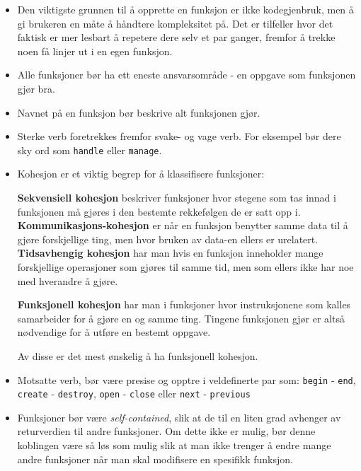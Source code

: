 \begin{itemize}
    \item Den viktigste grunnen til å opprette en funksjon er ikke kodegjenbruk, men å gi brukeren en måte å håndtere kompleksitet på. Det er tilfeller hvor det faktisk er mer lesbart å repetere dere selv et par ganger, fremfor å trekke noen få linjer ut i en egen funksjon.
    
    \item Alle funksjoner bør ha ett eneste ansvarsområde - en oppgave som funksjonen gjør bra.
    
    \item Navnet på en funksjon bør beskrive alt funksjonen gjør.
    
    \item Sterke verb foretrekkes fremfor svake- og vage verb. For eksempel bør dere sky ord som \verb|handle| eller \verb|manage|.
    
    \item Kohesjon er et viktig begrep for å klassifisere funksjoner:
    \begin{outline}
    \1 \textbf{Sekvensiell kohesjon} beskriver funksjoner hvor stegene som tas innad i funksjonen må gjøres i den bestemte rekkefølgen de er satt opp i.
    \1 \textbf{Kommunikasjons-kohesjon} er når en funksjon benytter samme data til å gjøre forskjellige ting, men hvor bruken av data-en ellers er urelatert.
    \1 \textbf{Tidsavhengig kohesjon} har man hvis en funksjon inneholder mange forskjellige operasjoner som gjøres til samme tid, men som ellers ikke har noe med hverandre å gjøre.
    
    \1 \textbf{Funksjonell kohesjon} har man i funksjoner hvor instruksjonene som kalles samarbeider for å gjøre en og samme ting. Tingene funksjonen gjør er altså nødvendige for å utføre en bestemt oppgave.
\end{outline}

    Av disse er det mest ønskelig å ha funksjonell kohesjon.
    

    \item Motsatte verb, bør være presise og opptre i veldefinerte par som: \verb|begin| - \verb|end|, \verb|create| - \verb|destroy|, \verb|open| - \verb|close| eller \verb|next| - \verb|previous|
    
    \item Funksjoner bør være \textit{self-contained}, slik at de til en liten grad avhenger av returverdien til andre funksjoner. Om dette ikke er mulig, bør denne koblingen være så løs som mulig slik at man ikke trenger å endre mange andre funksjoner når man skal modifisere en spesifikk funksjon.
\end{itemize}




